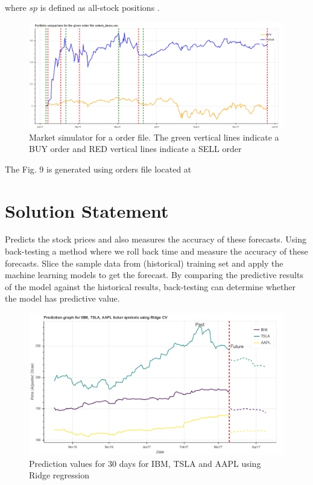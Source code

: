 \documentclass[12pt]{article}
\begin{document}
where $sp$ is defined as all-stock positions \cite{GeTechCourse}. 

\begin{figure}[!htbp]
\label{fig:optimized}
\begin{center}
\includegraphics[height=0.5\textheight,width=\textwidth]{market.png}
\caption{Market simulator for a order file. The green vertical lines indicate a BUY order and RED vertical lines indicate a SELL order }
\end{center}
\end{figure}

The Fig. 9 is generated using orders file located at \href{https://github.com/beegeesquare/QuantFy/blob/master/orders/orders_demo.csv}{\color{blue}{\bf Orders-demo}}

\section{Solution Statement}
\label{sec:solution}
Predicts the stock prices and also measures the accuracy of these forecasts. Using back-testing a method where we roll back time and measure the accuracy of these forecasts.  Slice the sample data from (historical) training set and apply the machine learning models to get the forecast.  By comparing the predictive results of the model against the historical results,  back-testing can determine whether the model has predictive value. 









\begin{figure}[!htbp]
\label{fig:ridge}
\begin{center}
\includegraphics[height=0.5\textheight,width=\textwidth]{ridge.png}
\caption{Prediction values for 30 days for IBM, TSLA and AAPL  using Ridge regression }
\end{center}
\end{figure}
\end{document}
